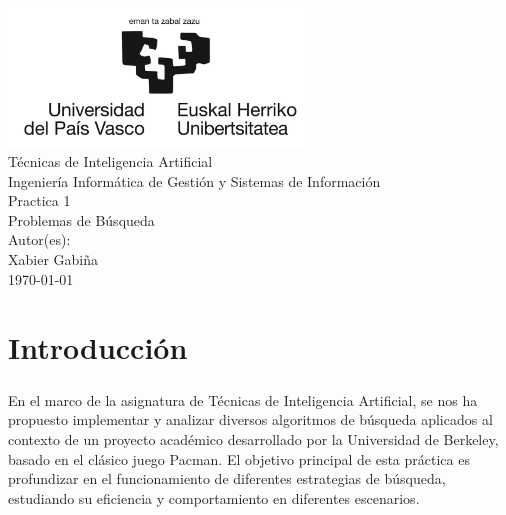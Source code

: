 \documentclass{report}
\begin{document}
    \begin{titlepage}
        \centering
        \includegraphics[width=0.6\textwidth]{./.img/logo.jpg}\\
        \vspace{1cm}
        \LARGE Técnicas de Inteligencia Artificial\\
        \vspace{0.5cm}
        \Large Ingeniería Informática de Gestión y Sistemas de Información\\
        \vspace{3cm}
        \Huge Practica 1\\
        \huge Problemas de Búsqueda\\
        \vspace{2.5cm}
        \Large Autor(es):\\
        \vspace{0.2cm}
        \large Xabier Gabiña\\
        \vfill
        \today
    \end{titlepage}
    \tableofcontents
    \chapter{Introducción}
      \paragraph*{}{
        En el marco de la asignatura de Técnicas de Inteligencia Artificial, se nos ha propuesto implementar y analizar diversos algoritmos de búsqueda aplicados al contexto de un proyecto académico desarrollado por la Universidad de Berkeley, basado en el clásico juego Pacman. El objetivo principal de esta práctica es profundizar en el funcionamiento de diferentes estrategias de búsqueda, estudiando su eficiencia y comportamiento en diferentes escenarios.\\
      }
      \paragraph*{}{

      }
\end{document}
